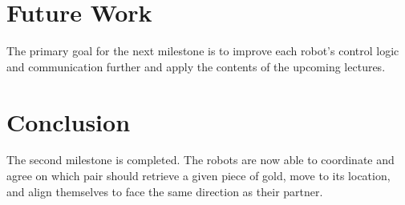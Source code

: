 \documentclass[12pt,a4paper]{article}
\begin{document}
\section{Future Work}
The primary goal for the next milestone is to improve each robot's control logic and communication further and apply the contents of the upcoming lectures.

\section{Conclusion}
The second milestone is completed. The robots are now able to coordinate and agree on which pair should retrieve a given piece of gold, move to its location, and align themselves to face the same direction as their partner. 
\end{document}
